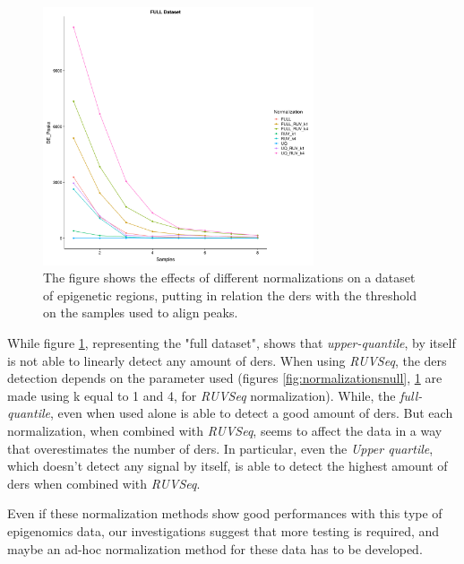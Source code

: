 \begin{figure}[H]
\centering
\includegraphics[width=8cm, keepaspectratio]{img/descan2/full_final.pdf}
\caption[Normalizations applied to detected regions]{The figure shows the effects of different normalizations on a dataset of epigenetic regions, putting in relation the \glspl{der} with the threshold on the samples used to align peaks.}
\label{fig:normalizationsfull}

\end{figure}

While figure \ref{fig:normalizationsfull}, representing the "full dataset", shows that \textit{upper-quantile}, by itself is not able to linearly detect any amount of \glspl{der}.
When using \textit{RUVSeq}, the \glspl{der} detection depends on the parameter used (figures \ref{fig:normalizationsnull}, \ref{fig:normalizationsfull} are made using k equal to 1 and 4, for \textit{RUVSeq} normalization).
While, the \textit{full-quantile}, even when used alone is able to detect a good amount of \glspl{der}.
But each normalization, when combined with \textit{RUVSeq}, seems to affect the data in a way that overestimates the number of \glspl{der}. 
In particular, even the \textit{Upper quartile}, which doesn't detect any signal by itself, is able to detect the highest amount of \glspl{der} when combined with \textit{RUVSeq}.

Even if these normalization methods show good performances with this type of epigenomics data, our investigations suggest that more testing is required, and maybe an ad-hoc normalization method for these data has to be developed.

